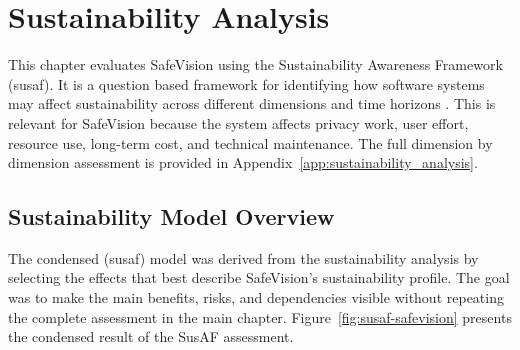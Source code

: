\chapter{Sustainability Analysis}
\label{chap:sustainability-analysis}

This chapter evaluates \gls{SafeVision} using the Sustainability Awareness Framework (\acrshort{susaf}). It is a question based framework for identifying how software systems may affect sustainability across different dimensions and time horizons \cite{duboc2020requirements}. This is relevant for \gls{SafeVision} because the system affects privacy work, user effort, resource use, long-term cost, and technical maintenance. The full dimension by dimension assessment is provided in Appendix~\ref{app:sustainability_analysis}.



\section{Sustainability Model Overview}
\label{sec:susaf_figure_explanation}

The condensed (\acrshort{susaf}) model was derived from the sustainability analysis by selecting the effects that best describe \gls{SafeVision}'s sustainability profile. The goal was to make the main benefits, risks, and dependencies visible without repeating the complete assessment in the main chapter. Figure~\ref{fig:susaf-safevision} presents the condensed result of the SusAF assessment.

